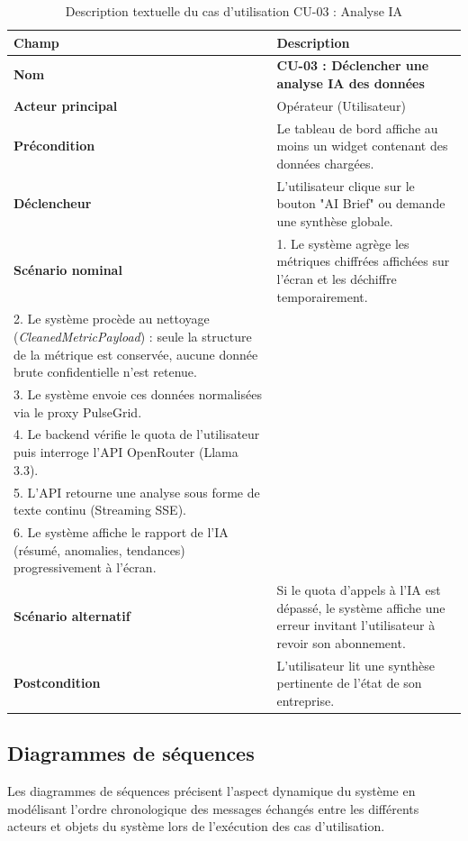 ﻿\documentclass[12pt,a4paper,oneside]{report} %
\begin{document}
\begin{table}[H]
\centering
\begin{tabularx}{\textwidth}{|l|X|}
\hline
\textbf{Champ} & \textbf{Description} \\ \hline
\textbf{Nom} & \textbf{CU-03 : Déclencher une analyse IA des données} \\ \hline
\textbf{Acteur principal} & Opérateur (Utilisateur) \\ \hline
\textbf{Précondition} & Le tableau de bord affiche au moins un widget contenant des données chargées. \\ \hline
\textbf{Déclencheur} & L'utilisateur clique sur le bouton "AI Brief" ou demande une synthèse globale. \\ \hline
\textbf{Scénario nominal} & 
1. Le système agrège les métriques chiffrées affichées sur l'écran et les déchiffre temporairement.\\
2. Le système procède au nettoyage (\textit{CleanedMetricPayload}) : seule la structure de la métrique est conservée, aucune donnée brute confidentielle n'est retenue.\\
3. Le système envoie ces données normalisées via le proxy PulseGrid.\\
4. Le backend vérifie le quota de l'utilisateur puis interroge l'API OpenRouter (Llama 3.3).\\
5. L'API retourne une analyse sous forme de texte continu (Streaming SSE).\\
6. Le système affiche le rapport de l'IA (résumé, anomalies, tendances) progressivement à l'écran. \\ \hline
\textbf{Scénario alternatif} & Si le quota d'appels à l'IA est dépassé, le système affiche une erreur invitant l'utilisateur à revoir son abonnement. \\ \hline
\textbf{Postcondition} & L'utilisateur lit une synthèse pertinente de l'état de son entreprise. \\ \hline
\end{tabularx}
\caption{Description textuelle du cas d'utilisation CU-03 : Analyse IA}
\end{table}

\newpage

\subsection{Diagrammes de séquences}

Les diagrammes de séquences précisent l'aspect dynamique du système en modélisant l'ordre chronologique des messages échangés entre les différents acteurs et objets du système lors de l'exécution des cas d'utilisation.
\end{document}
